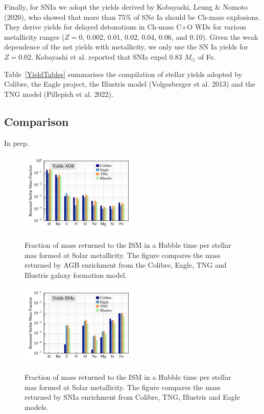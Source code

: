 \documentclass[11pt,a4paper,fleqn,usenatbib,twocolumn]{mnras}
\begin{document}
Finally, for SNIa we adopt the yields derived by Kobayashi, Leung \& Nomoto (2020), who showed that more than 75\% of SNe Ia should be Ch-mass explosions. They derive yields for delayed detonations in Ch-mass C+O WDs for various metallicity ranges ($Z = 0$, 0.002, 0.01, 0.02, 0.04, 0.06, and 0.10). Given the weak dependence of the net yields with metallicity, we only use the SN Ia yields for $Z=0.02$. Kobayashi et al. reported that SNIa expel 0.83 $M_{\odot}$ of Fe.

Table~\ref{YieldTables} summarises the compilation of stellar yields adopted by Colibre, the Eagle project, the Illustris model (Volgesberger et al. 2013) and the TNG model (Pillepich et al. 2022).

\subsection{Comparison}

In prep.

\begin{figure} 
\begin{center}
\includegraphics[angle=0,width=0.5\textwidth]{../figures/Comparison_AGBYield_tables.png}\\
\caption{Fraction of mass returned to the ISM in a Hubble time per stellar mas formed at Solar metallicity. The figure compares the mass returned by AGB enrichment from the Colibre, Eagle, TNG and Illustris galaxy formation model.}
\label{AGByields}
\end{center}
\end{figure}

\begin{figure} 
\begin{center}
\includegraphics[angle=0,width=0.5\textwidth]{../figures/Comparison_SNIaYield_tables.png}\\
\caption{Fraction of mass returned to the ISM in a Hubble time per stellar mas formed at Solar metallicity. The figure compares the mass returned by SNIa enrichment from Colibre, TNG, Illustris and Eagle models.}
\label{SNIayields}
\end{center}
\end{figure}
\end{document}
